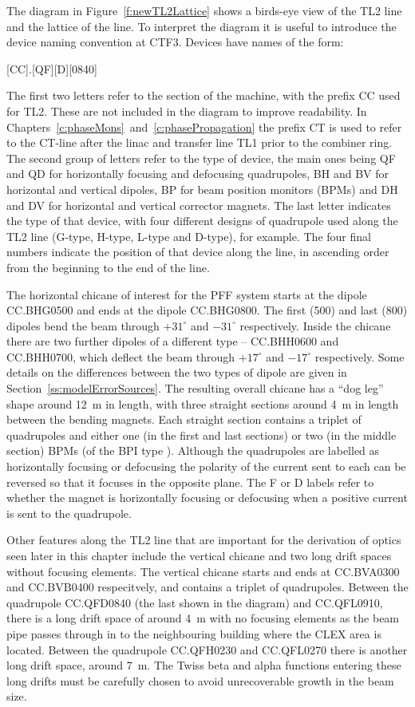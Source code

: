 The diagram in Figure~\ref{f:newTL2Lattice} shows a birds-eye view of the TL2 line and the lattice of the line. To interpret the diagram it is useful to introduce the device naming convention at CTF3. Devices have names of the form:
\begin{center}
[CC].[QF][D][0840]
\end{center}
The first two letters refer to the section of the machine, with the prefix CC used for TL2. These are not included in the diagram to improve readability. In Chapters~\ref{c:phaseMons}~and~\ref{c:phasePropagation} the prefix CT is used to refer to the CT-line after the linac and transfer line TL1 prior to the combiner ring. The second group of letters refer to the type of device, the main ones being QF and QD for horizontally focusing and defocusing quadrupoles, BH and BV for horizontal and vertical dipoles, BP for beam position monitors (BPMs) and DH and DV for horizontal and vertical corrector magnets. The last letter indicates the type of that device, with four different designs of quadrupole used along the TL2 line (G-type, H-type, L-type and D-type), for example. The four final numbers indicate the position of that device along the line, in ascending order from the beginning to the end of the line.

The horizontal chicane of interest for the PFF system starts at the dipole CC.BHG0500 and ends at the dipole CC.BHG0800. The first (500) and last (800) dipoles bend the beam through \(+31^\circ\) and \(-31^\circ\) respectively. Inside the chicane there are two further dipoles of a different type -- CC.BHH0600 and CC.BHH0700, which deflect the beam through \(+17^\circ\) and \(-17^\circ\) respectively. Some details on the differences between the two types of dipole are given in Section~\ref{ss:modelErrorSources}. The resulting overall chicane has a ``dog leg'' shape around 12~m in length, with three straight sections around 4~m in length between the bending magnets. Each straight section contains a triplet of quadrupoles and either one (in the first and last sections) or two (in the middle section) BPMs (of the BPI type \cite{bpi}). Although the quadrupoles are labelled as horizontally focusing or defocusing the polarity of the current sent to each can be reversed so that it focuses in the opposite plane. The F or D labels refer to whether the magnet is horizontally focusing or defocusing when a positive current is sent to the quadrupole.

Other features along the TL2 line that are important for the derivation of optics seen later in this chapter include the vertical chicane and two long drift spaces without focusing elements. The vertical chicane starts and ends at CC.BVA0300 and CC.BVB0400 respecitvely, and contains a triplet of quadrupoles. Between the quadrupole CC.QFD0840 (the last shown in the diagram) and CC.QFL0910, there is a long drift space of around 4~m with no focusing elements as the beam pipe passes through in to the neighbouring building where the CLEX area is located. Between the quadrupole CC.QFH0230 and CC.QFL0270 there is another long drift space, around 7~m. The Twiss beta and alpha functions entering these long drifts must be carefully chosen to avoid unrecoverable growth in the beam size.

